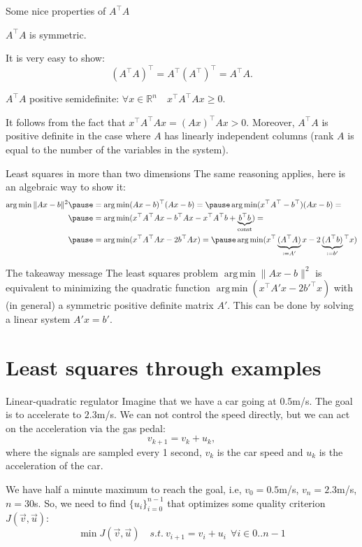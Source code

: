 \documentclass[UKenglish,aspectratio=169]{beamer}
\DeclareMathOperator*{\argmin}{arg\,min}
\begin{document}
\begin{frame}{Some nice properties of $A^\top A$}
\begin{theorem}
$A^\top A$ is symmetric.
\end{theorem}
\pause
It is very easy to show:
$$
(A^\top A)^\top = A^\top (A^\top)^\top = A^\top A.
$$

\pause
\begin{theorem}
$A^\top A$ positive semidefinite: $\forall x\in \mathbb R^n\quad x^\top A^\top A x \geq 0.$
\end{theorem}
\pause
It follows from the fact that $x^\top A^\top A x = (A x)^\top A x > 0$.
Moreover, $A^\top A$ is positive definite in the case where $A$ has linearly independent columns (rank $A$ is equal to the number of the variables in the system).
\end{frame}

\begin{frame}{Least squares in more than two dimensions}
The same reasoning applies, here is an algebraic way to show it:
$$
\begin{aligned}
\argmin \| Ax - b \|^2 \pause &= \argmin (Ax-b)^\top (Ax-b) = \pause
 \argmin(x^\top A^\top - b^\top)(Ax-b) = \\ \pause
& = \argmin(x^\top A^\top A x - b^\top Ax - x^\top A^\top b + \underbrace{b^\top b}_{\rm const})=\\ \pause
& = \argmin(x^\top A^\top A x - 2b^\top Ax) = \pause
 \argmin(x^\top \underbrace{(A^\top A)}_{:=A'} x - 2\underbrace{(A^\top b)}_{:=b'}\phantom{}^\top x)
\end{aligned}
$$
\pause
\begin{block}{The takeaway message}
The least squares problem $\argmin \| Ax - b \|^2$  is equivalent to minimizing the quadratic function $\argmin \left(x^\top A' x - 2b'^\top x\right)$
with (in general) a symmetric positive definite matrix $A'$. This can be done by solving a linear system $A'x = b'$.
\end{block}
\end{frame}

\section{Least squares through examples}
\begin{frame}{Linear-quadratic regulator}
Imagine that we have a car going at $0.5$m/s. The goal is to accelerate to $2.3$m/s.
We can not control the speed directly, but we can act on the acceleration via the gas pedal:
$$
v_{k+1} = v_k + u_k,
$$
where the signals are sampled every 1 second, $v_k$ is the car speed and $u_k$ is the acceleration of the car.

We have half a minute maximum to reach the goal, i.e, $v_0=0.5$m/s, $v_n=2.3$m/s, $n=30$s.
So, we need to find $\{u_i\}_{i=0}^{n-1}$ that optimizes some quality criterion $J(\vec{v}, \vec{u})$:
$$
\min J(\vec{v},\vec{u}) \quad s.t.~  v_{i+1} = v_i + u_i ~~ \forall i \in 0..n-1
$$



\end{frame}
\end{document}
